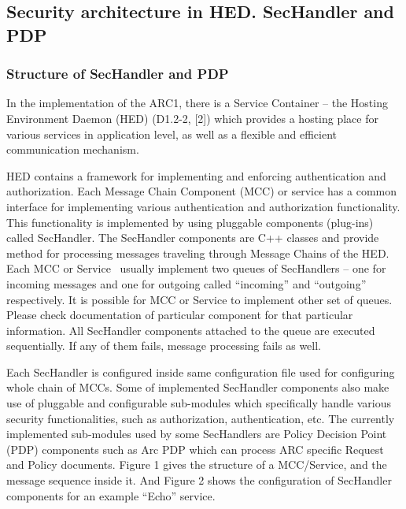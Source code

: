 \documentclass[a4paper]{article}
\newcounter{Figure}
\begin{document}
\bigskip

\subsection{Security architecture in HED. SecHandler and PDP}
\subsubsection{Structure of SecHandler and PDP}
{\upshape\color{black}
In the implementation of the ARC1, there is a Service Container -- the
Hosting Environment Daemon (HED) (D1.2-2, [2]) which provides a hosting
place for various services in application level, as well as a flexible
and efficient communication mechanism.}

{\upshape\color{black}
HED contains a framework for implementing and enforcing authentication
and authorization. Each Message Chain Component (MCC) or service has a
common interface for implementing various authentication and
authorization functionality. This functionality is implemented by using
pluggable components (plug-ins) called SecHandler. The SecHandler
components are C++ classes and provide method for processing messages
traveling through Message Chains of the HED. Each MCC or Service
\ usually implement two queues of SecHandlers -- one for incoming
messages and one for outgoing called
{\textquotedblleft}incoming{\textquotedblright} and
{\textquotedblleft}outgoing{\textquotedblright} respectively. It is
possible for MCC or Service to implement other set of queues. Please
check documentation of particular component for that particular
information. All SecHandler components attached to the queue are
executed sequentially. If any of them fails, message processing fails
as well.}

{\upshape\color{black}
Each SecHandler is configured inside same configuration file used for
configuring whole chain of MCCs. Some of implemented SecHandler
components also make use of pluggable and configurable sub-modules
which specifically handle various security functionalities, such as
authorization, authentication, etc. The currently implemented
sub-modules used by some SecHandlers are Policy Decision Point (PDP)
components such as Arc PDP which can process ARC specific Request and
Policy documents. Figure 1 gives the structure of a MCC/Service, and
the message sequence inside it. And Figure 2 shows the configuration of
SecHandler components for an example
{\textquotedblleft}Echo{\textquotedblright} service.}
\end{document}
